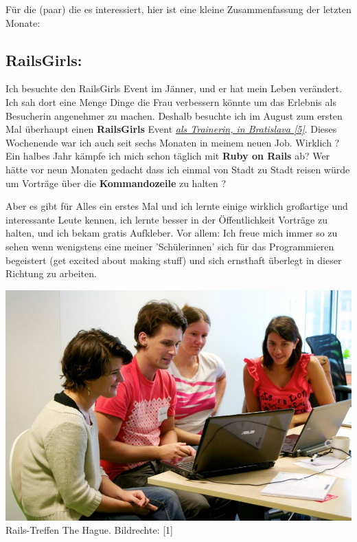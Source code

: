 \documentclass[10pt,a4paper,ngerman,twoside]{article} %
\begin{document}
\begin{multicols}{3}
Für die (paar) die es interessiert, hier ist eine kleine Zusammenfassung der letzten Monate:

\subsection*{RailsGirls:}

Ich besuchte den RailsGirls Event im Jänner, und er hat mein Leben verändert. Ich sah dort eine Menge Dinge die Frau verbessern könnte um das Erlebnis als Besucherin angenehmer zu machen. Deshalb besuchte ich im August zum ersten Mal überhaupt einen \textbf{RailsGirls} Event \href{http://railsgirls.com/bratislava}{\textit{als Trainerin, in Bratislava [5]}}. Dieses Wochenende war ich auch seit sechs Monaten in meinem neuen Job. Wirklich ? Ein halbes Jahr kämpfe ich mich schon täglich mit \textbf{Ruby on Rails} ab? Wer hätte vor neun Monaten gedacht dass ich einmal von Stadt zu Stadt reisen würde um Vorträge über die \textbf{Kommandozeile} zu halten ? 

Aber es gibt für Alles ein erstes Mal und ich lernte einige wirklich großartige und interessante Leute kennen, ich lernte besser in der Öffentlichkeit Vorträge zu halten, und ich bekam gratis Aufkleber. Vor allem: Ich freue mich immer so zu sehen wenn wenigstens eine meiner 'Schülerinnen' sich für das Programmieren begeistert (get excited about making stuff) und sich ernsthaft überlegt in dieser Richtung zu arbeiten.   

\begin{center}
\includegraphics[width=\linewidth]{laura/floor_rg_thehague_3.jpg}
\footnotesize{Rails-Treffen The Hague. Bildrechte: [1]}
\end{center}



\end{multicols}
\end{document}
